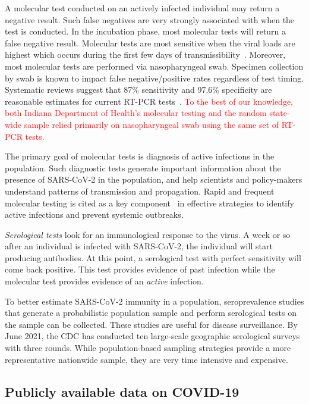 \documentclass[11pt]{amsart}
\numberwithin{equation}{section}
\theoremstyle{plain}
\begin{document}
 A molecular test conducted on an actively infected individual may return a negative result.  Such false negatives are very strongly associated with when the test is conducted.  In the incubation phase, most molecular tests will return a false negative result.  Molecular tests are most sensitive when the viral loads are highest which occurs during the first few days of transmissibility~\citep{Mina2020}.   Moreover, most molecular tests are performed via nasopharyngeal swab.  Specimen collection by swab is known to impact false negative/positive rates regardless of test timing.   Systematic reviews suggest that 87\% sensitivity and 97.6\% specificity are reasonable estimates for current RT-PCR tests~\citep{Arevalo2020, Woloshin2020,Cohen2020}.  \textcolor{red}{To the best of our knowledge, both Indiana Department of Health's molecular testing and the random state-wide sample relied primarily on nasopharyngeal swab using the same set of RT-PCR tests.}

 The primary goal of molecular tests is diagnosis of active infections in the population.  Such diagnostic tests generate important information about the presence of SARS-CoV-2 in the population, and help scientists and policy-makers understand patterns of transmission and propagation. Rapid and frequent molecular testing is cited as a key component~\citep{OECD2021} in effective strategies to identify active infections and prevent systemic outbreaks.


\emph{Serological tests} look for an immunological response to the virus.  A week or so after an individual is infected with SARS-CoV-2, the individual will start producing antibodies.  At this point, a serological test with perfect sensitivity will come back positive.  This test provides evidence of past infection while the molecular test provides evidence of an \emph{active} infection.

To better estimate SARS-CoV-2 immunity in a population, seroprevalence studies that generate a probabilistic population sample and perform serological tests on the sample can be collected.  These studies are useful for disease surveillance. By June 2021, the CDC has conducted ten large-scale geographic serological surveys with three rounds.  While population-based sampling strategies provide a more representative nationwide sample, they are very time intensive and expensive.

 \subsection{Publicly available data on COVID-19}
 \label{subsection:testinginfo}
\end{document}
